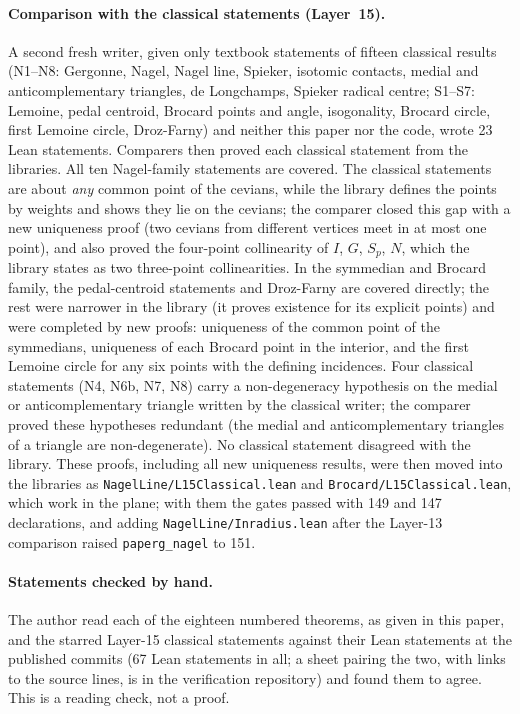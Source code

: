 \documentclass[11pt]{article}
\theoremstyle{definition}
\theoremstyle{remark}
\newcommand{\lean}[1]{\texttt{#1}}
\begin{document}
\paragraph{Comparison with the classical statements (Layer~15).} A second fresh writer, given only
textbook statements of fifteen classical results (N1--N8: Gergonne, Nagel, Nagel line, Spieker,
isotomic contacts, medial and anticomplementary triangles, de Longchamps, Spieker radical centre;
S1--S7: Lemoine, pedal centroid, Brocard points and angle, isogonality, Brocard circle, first Lemoine
circle, Droz-Farny) and neither this paper nor the code, wrote 23 Lean statements. Comparers then
proved each classical statement from the libraries. All ten Nagel-family statements are covered. The
classical statements are about \emph{any} common point of the cevians, while the library defines the
points by weights and shows they lie on the cevians; the comparer closed this gap with a new
uniqueness proof (two cevians from different vertices meet in at most one point), and also proved the
four-point collinearity of $I$, $G$, $S_p$, $N$, which the library states as two three-point
collinearities. In the symmedian and Brocard family, the pedal-centroid statements and Droz-Farny are
covered directly; the rest were narrower in the library (it proves existence for its explicit points)
and were completed by new proofs: uniqueness of the common point of the symmedians, uniqueness of each
Brocard point in the interior, and the first Lemoine circle for any six points with the defining
incidences. Four classical statements (N4, N6b, N7, N8) carry a non-degeneracy hypothesis on the medial or anticomplementary triangle written by the classical writer; the comparer proved these hypotheses redundant (the medial and anticomplementary triangles of a triangle are non-degenerate). No classical statement disagreed with the library. These proofs, including all new
uniqueness results, were then moved into the libraries as \lean{NagelLine/L15Classical.lean} and
\lean{Brocard/L15Classical.lean}, which work in the plane; with them the gates passed with 149 and
147 declarations, and adding \lean{NagelLine/Inradius.lean} after the Layer-13 comparison raised
\lean{paperg\_nagel} to 151.

\paragraph{Statements checked by hand.} The author read each of the eighteen numbered theorems, as
given in this paper, and the starred Layer-15 classical statements against their Lean statements at
the published commits (67 Lean statements in all; a sheet pairing the two, with links to the source lines,
is in the verification repository) and found them to agree. This is a reading check, not a proof.
\end{document}
